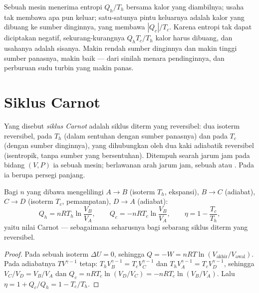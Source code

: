 \begin{remark}\label{rem:b1:heat-engines:why}
Sebuah mesin menerima entropi $Q_h/T_h$ bersama kalor yang diambilnya; usaha
tak membawa apa pun keluar; satu-satunya pintu keluarnya adalah kalor yang dibuang ke sumber dinginnya,
yang membawa $|Q_c|/T_c$. Karena entropi tak dapat diciptakan negatif, sekurang-kurangnya
$Q_h T_c/T_h$ kalor harus dibuang, dan usahanya adalah sisanya.
Makin rendah sumber dinginnya dan makin tinggi sumber panasnya, makin baik --- dari sinilah
menara pendinginnya, dan perburuan sudu turbin yang makin panas.
\end{remark}

\section{Siklus Carnot}

\begin{definition}\label{def:b1:heat-engines:carnotcycle}
Yang disebut \emph{siklus Carnot} adalah siklus diterm yang reversibel: dua isoterm
reversibel, pada $T_h$ (dalam sentuhan dengan sumber panasnya) dan pada $T_c$ (dengan
sumber dinginnya), yang dihubungkan oleh dua kaki adiabatik reversibel (isentropik,
tanpa sumber yang bersentuhan). Ditempuh searah jarum jam pada bidang $(V, P)$ ia sebuah
mesin; berlawanan arah jarum jam, sebuah  atau . Pada  ia berupa persegi panjang.
\end{definition}

\begin{proposition}\label{prop:b1:heat-engines:carnotgas}
Bagi $n$   yang dibawa mengelilingi $A \to B$ (isoterm $T_h$,
ekspansi), $B \to C$ (adiabat), $C \to D$ (isoterm $T_c$,
pemampatan), $D \to A$ (adiabat):
\[
Q_h = nRT_h\ln\frac{V_B}{V_A}, \qquad
Q_c = -nRT_c\ln\frac{V_B}{V_A}, \qquad
\eta = 1 - \frac{T_c}{T_h} ,
\]
yaitu nilai Carnot --- sebagaimana seharusnya bagi sebarang siklus diterm yang reversibel.
\end{proposition}

\begin{proof}
Pada sebuah isoterm $\Delta U = 0$, sehingga $Q = -W = nRT\ln(V_{\text{akhir}}/
V_{\text{awal}})$. Pada adiabatnya $TV^{\gamma-1}$ tetap:
$T_hV_B^{\gamma-1} = T_cV_C^{\gamma-1}$ dan $T_hV_A^{\gamma-1} =
T_cV_D^{\gamma-1}$, sehingga $V_C/V_D = V_B/V_A$ dan $Q_c = nRT_c\ln(V_D/V_C) =
-nRT_c\ln(V_B/V_A)$. Lalu $\eta = 1 + Q_c/Q_h = 1 - T_c/T_h$.
\end{proof}


